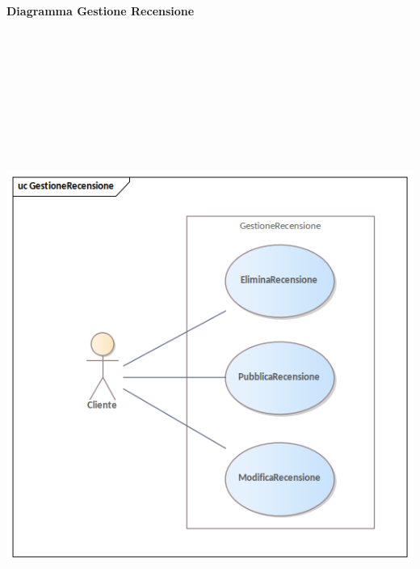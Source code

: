 \newpage\paragraph{Diagramma Gestione Recensione}\mbox{}\\
\begin{center}
  \includegraphics[width=\textwidth, height=20cm, keepaspectratio]{immagini/GestioneDeiRequisiti/GestioneRecensione.png}
\end{center}

\newpage
